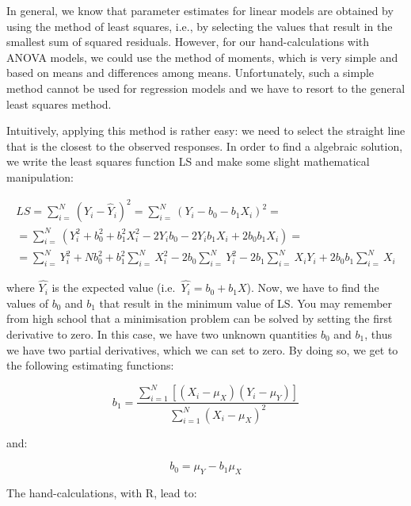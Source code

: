 \documentclass[a4paper,12pt,oneside]{book}
\begin{document}
In general, we know that parameter estimates for linear models are obtained by using the method of least squares, i.e., by selecting the values that result in the smallest sum of squared residuals. However, for our hand-calculations with ANOVA models, we could use the method of moments, which is very simple and based on means and differences among means. Unfortunately, such a simple method cannot be used for regression models and we have to resort to the general least squares method.

Intuitively, applying this method is rather easy: we need to select the straight line that is the closest to the observed responses. In order to find a algebraic solution, we write the least squares function LS and make some slight mathematical manipulation:

\[\begin{array}{l}
LS = \sum\limits_{i = }^N {\left( {{Y_i} - \hat Y_i} \right)^2 = \sum\limits_{i = }^N {{{\left( {{Y_i} - {b_0} - {b_1}{X_i}} \right)}^2}}  = } \\
 = \sum\limits_{i = }^N {\left( {Y_i^2 + b_0^2 + b_1^2X_i^2 - 2{Y_i}{b_0} - 2{Y_i}{b_1}{X_i} + 2{b_0}{b_1}{X_i}} \right)}  = \\
 = \sum\limits_{i = }^N {Y_i^2 + Nb_0^2 + b_1^2\sum\limits_{i = }^N {X_i^2 - 2{b_0}\sum\limits_{i = }^N {Y_i^2 - 2{b_1}\sum\limits_{i = }^N {{X_i}{Y_i} + } } } } 2{b_0}{b_1}\sum\limits_{i = }^N {{X_i}} 
\end{array} \]

where \(\hat{Y_i}\) is the expected value (i.e.~\(\hat{Y_i} = b_0 + b_1 X\)). Now, we have to find the values of \(b_0\) and \(b_1\) that result in the minimum value of LS. You may remember from high school that a minimisation problem can be solved by setting the first derivative to zero. In this case, we have two unknown quantities \(b_0\) and \(b_1\), thus we have two partial derivatives, which we can set to zero. By doing so, we get to the following estimating functions:

\[{b_1} = \frac{{\sum\limits_{i = 1}^N {\left[ {\left( {{X_i} - {\mu _X}} \right)\left( {{Y_i} - {\mu _Y}} \right)} \right]} }}{{\sum\limits_{i = 1}^N {{{\left( {{X_i} - {\mu _X}} \right)}^2}} }}\]

and:

\[{b_0} = {\mu _Y} - {b_1}{\mu _X}\]

The hand-calculations, with R, lead to:
\end{document}
